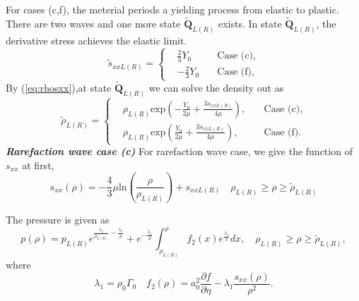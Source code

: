 \documentclass[review]{elsarticle}
\begin{document}
\begin{enumerate}[Step 1]
For cases (c,f), the meterial periods a yielding process from elastic to plastic. There are two waves and  one more state $\tilde{\mathbf{Q}}_{L(R)}$ exists. In state $\tilde{\mathbf{Q}}_{L(R)}$, the derivative stress achieves the elastic limit. 
\begin{equation}
 \tilde{s}_{xxL(R)} = \left\{ \begin{aligned}
	 &\frac{2}{3}Y_0 \quad  &\text{Case (c)},\\
	 &-\frac{2}{3}Y_0 \quad &\text{Case (f)},
	\end{aligned}
  \right.
\end{equation}
By (\ref{eq:rhosxx}),at state $\tilde{\mathbf{Q}}_{L(R)}$ we can solve the density out as 
\begin{equation}
  \tilde{\rho}_{L(R)}= \left\{ \begin{aligned}
	  & \rho_{L(R)} \text{exp}\left(-\frac{Y_0}{2\mu}+\frac{3 s_{xxL(R)}}{4\mu}\right), \quad  & \text{Case (c)}, \\ 
	  & \rho_{L(R)} \text{exp}\left(\frac{Y_0}{2\mu}+\frac{3 s_{xxL(R)}}{4\mu}\right), \quad  & \text{Case (f)}. 
	\end{aligned}
  \right.
	\end{equation}
	\emph{\textbf{Rarefaction wave case (c)}}
For rarefaction wave case,
we give the function of $s_{xx}$ at first,
\begin{equation}
  s_{xx}(\rho) =
	 -\frac{4}{3}\mu\text{ln}\left(\frac{\rho}{\rho_{L(R)}}\right)+s_{xxL(R)} \quad  \rho_{L(R)} \ge \rho \ge \tilde{\rho}_{L(R)}
  \end{equation}

The pressure is given as 
\begin{equation}
  p(\rho)=
	  p_{L(R)}e^{\frac{\lambda_1}{\rho_{L(R)}}-\frac{\lambda_1}{\rho}} +e^{-\frac{\lambda_1}{\rho}}\int_{\rho_{L(R)}}^{\rho} f_2(x) e^{\frac{\lambda_1}{x}}dx,\quad  \rho_{L(R)}\ge \rho \ge \tilde{\rho}_{L(R)},
\end{equation}
where 
\begin{equation}
  \lambda_1 = \rho_0 \Gamma_0 \quad f_2(\rho) = a_0^2\frac{\partial f}{\partial \eta}- \lambda_1\frac{s_{xx}(\rho)}{\rho^2}.
\end{equation}


\end{enumerate}
\end{document}
